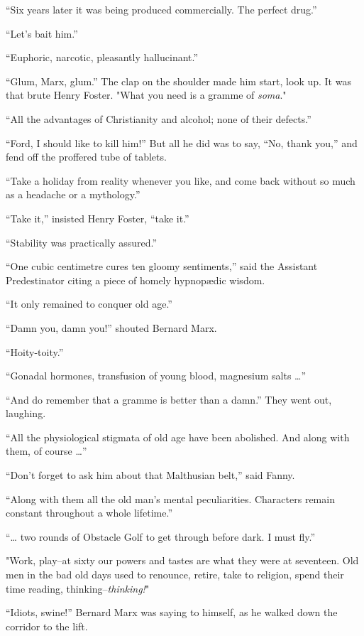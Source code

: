 \documentclass[12pt]{report}
\begin{document}
``Six years later it was being produced commercially. The perfect
drug.''

``Let's bait him.''

``Euphoric, narcotic, pleasantly hallucinant.''

``Glum, Marx, glum.'' The clap on the shoulder made him start, look up.
It was that brute Henry Foster. "What you need is a gramme of
\emph{soma}."

``All the advantages of Christianity and alcohol; none of their
defects.''

``Ford, I should like to kill him!'' But all he did was to say, ``No,
thank you,'' and fend off the proffered tube of tablets.

``Take a holiday from reality whenever you like, and come back without
so much as a headache or a mythology.''

``Take it,'' insisted Henry Foster, ``take it.''

``Stability was practically assured.''

``One cubic centimetre cures ten gloomy sentiments,'' said the Assistant
Predestinator citing a piece of homely hypnopædic wisdom.

``It only remained to conquer old age.''

``Damn you, damn you!'' shouted Bernard Marx.

``Hoity-toity.''

``Gonadal hormones, transfusion of young blood, magnesium salts
\ldots{}''

``And do remember that a gramme is better than a damn.'' They went out,
laughing.

``All the physiological stigmata of old age have been abolished. And
along with them, of course \ldots{}''

``Don't forget to ask him about that Malthusian belt,'' said Fanny.

``Along with them all the old man's mental peculiarities. Characters
remain constant throughout a whole lifetime.''

``\ldots{} two rounds of Obstacle Golf to get through before dark. I
must fly.''

"Work, play--at sixty our powers and tastes are what they were at
seventeen. Old men in the bad old days used to renounce, retire, take to
religion, spend their time reading, thinking--\emph{thinking!}"

``Idiots, swine!'' Bernard Marx was saying to himself, as he walked down
the corridor to the lift.
\end{document}
